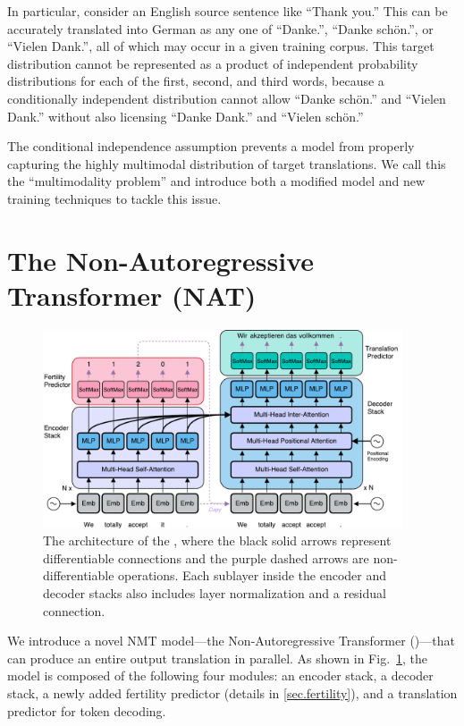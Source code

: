 In particular, consider an English source sentence like ``Thank you.'' This can be accurately translated into German as any one of ``Danke.'', ``Danke sch\"{o}n.'', or ``Vielen Dank.'', all of which may occur in a given training corpus. This target distribution cannot be represented as a product of independent probability distributions for each of the first, second, and third words, because a conditionally independent distribution cannot allow ``Danke sch\"{o}n.'' and ``Vielen Dank.'' without also licensing ``Danke Dank.'' and ``Vielen sch\"{o}n.''

The conditional independence assumption prevents a model from properly capturing the highly multimodal distribution of target translations.
We call this the ``multimodality problem'' and introduce both a modified model and new training techniques to tackle this issue.

\section{The Non-Autoregressive Transformer (NAT)}\label{mainModelSection}

\begin{figure}
\centering
\includegraphics[width=0.95\textwidth]{figs/nat/NAT-sub}
\caption{\label{fig.diagram} The architecture of the \model{}, where the black solid arrows represent differentiable connections and the purple dashed arrows are non-differentiable operations. Each sublayer inside the encoder and decoder stacks also includes layer normalization and a residual connection.}
\vspace{-20pt}
\end{figure}

We introduce a novel NMT model---the Non-Autoregressive Transformer (\model)---that can produce an entire output translation in parallel.
As shown in Fig.~\ref{fig.diagram}, the model is composed of the following four modules: 
an encoder stack, 
a decoder stack, 
a newly added fertility predictor (details in \ref{sec.fertility}), and a translation predictor for token decoding. 


